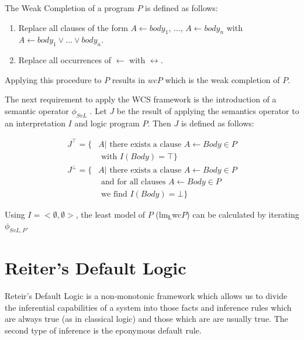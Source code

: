 The Weak Completion of a program $P$ is defined as follows:

\begin{enumerate}
\item Replace all clauses of the form $A \leftarrow body_1$, ..., $A \leftarrow body_n$ with $A \leftarrow body_1 \lor ... \lor body_n$.
\item Replace all occurrences of $\leftarrow$ with $\leftrightarrow$.
\end{enumerate}

Applying this procedure to $P$ results in $wcP$ which is the weak completion of $P$.

The next requirement to apply the WCS framework is the introduction of a semantic operator $\phi_{SvL}$ \citep{stenning2008interpretation}. Let $J$ be the result of applying the semantics operator to an interpretation $I$ and logic program $P$. Then $J$ is defined as follows:

\[
\begin{split}
J^\top = \{ & A | \textrm{ there exists a clause } A\leftarrow Body \in P \\ & \textrm{ with } I(Body) = \top\}
\end{split}
\]
\[
\begin{split}
J^\bot = \{ &  A | \textrm{ there exists a clause } A \leftarrow Body \in P \\
           & \textrm{ and for all clauses } A \leftarrow Body \in P \\ & \textrm{ we find } I(Body) = \bot\}
\end{split}
\]

Using $I=<\emptyset, \emptyset>$, the least model of $P$ ($\textrm{lm}_\textrm{\L}$wc$P$) can be calculated by iterating $\phi_{SvL,P}$.

\section{Reiter's Default Logic}
Reteir's Default Logic \citep{reiter1980logic} is a non-monotonic framework which allows us to divide the inferential capabilities of a system into those facts and inference rules which are always true (as in classical logic) and those which are are usually true. The second type of inference is the eponymous default rule.

